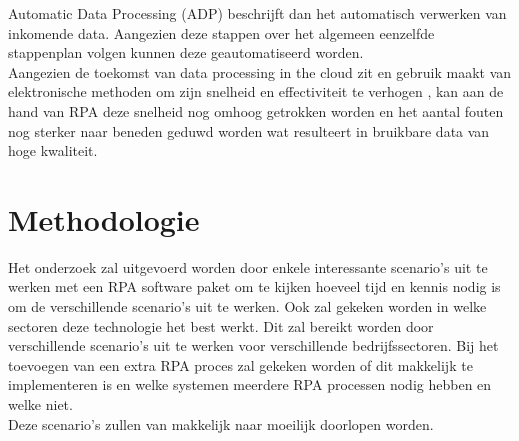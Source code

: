 Automatic Data Processing (ADP) beschrijft dan het automatisch verwerken van inkomende data. Aangezien deze stappen over het algemeen eenzelfde stappenplan volgen kunnen deze geautomatiseerd worden. \\
Aangezien de toekomst van data processing in the cloud zit en gebruik maakt van elektronische methoden om zijn snelheid en effectiviteit te verhogen \autocite{whatIsDP}, kan aan de hand van RPA deze snelheid nog omhoog getrokken worden en het aantal fouten nog sterker naar beneden geduwd worden wat resulteert in bruikbare data van hoge kwaliteit.

\section{Methodologie}
\label{sec:methodologie}
Het onderzoek zal uitgevoerd worden door enkele interessante scenario's uit te werken met een RPA software paket om te kijken hoeveel tijd en kennis nodig is om de verschillende scenario's uit te werken. Ook zal gekeken worden in welke sectoren deze technologie het best werkt. Dit zal bereikt worden door verschillende scenario's uit te werken voor verschillende bedrijfssectoren. Bij het toevoegen van een extra RPA  proces zal gekeken worden of dit makkelijk te implementeren is en welke systemen meerdere RPA processen nodig hebben en welke niet. \\
Deze scenario's zullen van makkelijk naar moeilijk doorlopen worden.


